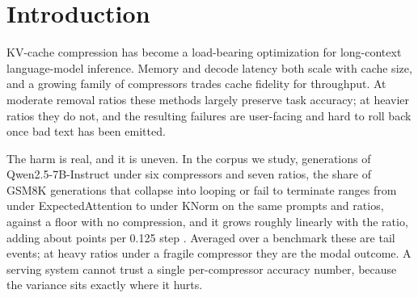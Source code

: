 \section{Introduction}

KV-cache compression has become a load-bearing optimization for long-context
language-model inference. Memory and decode latency both scale with cache
size, and a growing family of compressors trades cache fidelity for
throughput. At moderate removal ratios these methods largely preserve task
accuracy; at heavier ratios they do not, and the resulting failures are
user-facing and hard to roll back once bad text has been emitted.

The harm is real, and it is uneven. In the corpus we study, generations of
Qwen2.5-7B-Instruct under six compressors and seven ratios, the share of
GSM8K generations that collapse into looping or fail to terminate ranges from
 under ExpectedAttention to  under KNorm on the same
prompts and ratios, against a  floor with no compression, and it
grows roughly linearly with the ratio, adding about  points per
0.125 step . Averaged over a benchmark these are tail
events; at heavy ratios under a fragile compressor they are the modal
outcome. A serving system cannot trust a single per-compressor accuracy
number, because the variance sits exactly where it hurts.

